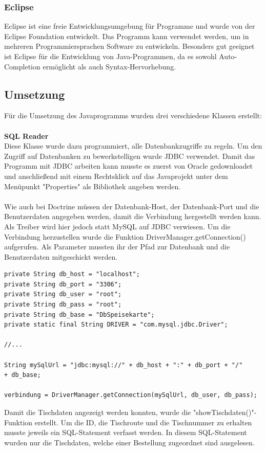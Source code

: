       \subsubsection{Eclipse}

Eclipse ist eine freie Entwicklungsumgebung für Programme und wurde von der Eclipse Foundation entwickelt. Das Programm kann verwendet werden, um in mehreren Programmiersprachen Software zu entwickeln. Besonders gut geeignet ist Eclipse für die Entwicklung von Java-Programmen, da es sowohl Auto-Completion ermöglicht als auch Syntax-Hervorhebung.

  \subsection{Umsetzung}
Für die Umsetzung des Javaprogramms wurden drei verschiedene Klassen erstellt:\\ \\
\textbf{SQL Reader}\\
Diese Klasse wurde dazu programmiert, alle Datenbankzugriffe zu regeln.
Um den {Zugriff auf Datenbanken zu bewerkstelligen wurde JDBC\cite{jdbctutorial}} verwendet.
Damit das Programm mit JDBC arbeiten kann musste es zuerst von Oracle gedownloadet und anschließend mit einem Rechtsklick auf das Javaprojekt unter dem Menüpunkt "Properties" als Bibliothek angeben werden.
\\ \\
Wie auch bei Doctrine müssen der Datenbank-Host, der Datenbank-Port und die Benutzerdaten angegeben werden, damit die Verbindung hergestellt werden kann.
Als Treiber wird hier jedoch statt MySQL auf JDBC verwiesen.
Um die Verbindung herzustellen wurde die Funktion DriverManager.getConnection() aufgerufen. Als Parameter mussten ihr der Pfad zur Datenbank und die Benutzerdaten mitgeschickt werden.
\lstset{language = java}
  	\begin{lstlisting}
private String db_host = "localhost";
private String db_port = "3306";
private String db_user = "root";
private String db_pass = "root";
private String db_base = "DbSpeisekarte";
private static final String DRIVER = "com.mysql.jdbc.Driver";

//...

String mySqlUrl = "jdbc:mysql://" + db_host + ":" + db_port + "/"
+ db_base;

verbindung = DriverManager.getConnection(mySqlUrl, db_user, db_pass);
	\end{lstlisting}
Damit die Tischdaten angezeigt werden konnten, wurde die "showTischdaten()"-Funktion erstellt. Um die ID, die Tischroute und die Tischnummer zu erhalten musste jeweils ein SQL-Statement verfasst werden. In diesem SQL-Statement wurden nur die Tischdaten, welche einer Bestellung zugeordnet sind ausgelesen.
